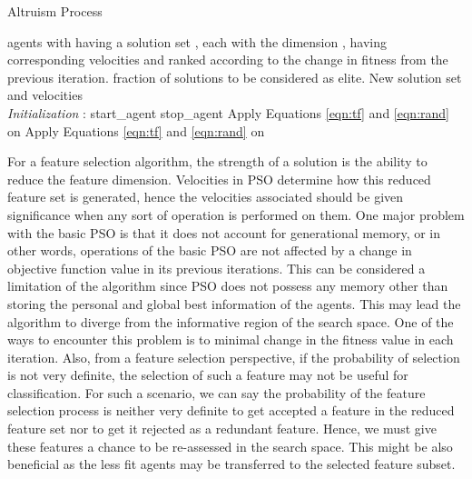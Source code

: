 \documentclass[final,3p,times]{elsarticle}
\begin{document}
\begin{algorithm}[ht!]
      \caption{Altruism Process}
    \label{alg:altPSO}
     \begin{algorithmic}[1]
     \renewcommand{\algorithmicrequire}{\textbf{Input:}}
     \renewcommand{\algorithmicensure}{\textbf{Output:}}
     \REQUIRE  agents with having a solution set , each with the dimension , having corresponding velocities  and ranked according to the change in fitness from the previous iteration.  fraction of solutions to be considered as elite.
     \ENSURE  New solution set  and velocities 
     \\ \textit{Initialization} :
     \STATE start\_agent  
     \STATE stop\_agent  
        \STATE   
            \IF{}
                \IF{}
                \STATE  
                \STATE  
                \STATE  
                \STATE  Apply Equations \ref{eqn:tf} and \ref{eqn:rand} on 
                \ENDIF
            \ELSE
                \IF{}
                \STATE  
                \STATE  
                \STATE  
                \STATE  Apply Equations \ref{eqn:tf} and \ref{eqn:rand} on 
                \ENDIF
            \ENDIF
        \ENDFOR
    \ENDFOR
     \end{algorithmic} 

 \end{algorithm}
For a feature selection algorithm, the strength of a solution is the ability to reduce the feature dimension. Velocities in PSO determine how this reduced feature set is generated, hence the velocities associated should be given significance when any sort of {operation is performed on them.} One major problem with {the basic} PSO is that it does not account for generational memory, or in other words, operations of the basic PSO are not affected by a change in objective function value in its previous iterations. This can be considered a limitation of the algorithm since PSO does not possess any memory other than storing the personal and global best information of the agents. This may lead the algorithm to diverge from the informative region of the search space. One of the ways to encounter this problem is to minimal change {in} the fitness value in each iteration. {Also,} from a feature selection perspective, if the probability of selection is not very definite, the selection of such a feature may not be useful for classification. For such a scenario, we can say the probability of the feature selection {process} is {neither} very definite to get accepted a feature in the reduced feature set nor to get {it} rejected as a redundant feature. {Hence, we must} give these features a chance to be re-assessed in the search {space. This might }be also beneficial as the less fit agents may be transferred to the selected feature subset.
\end{document}
